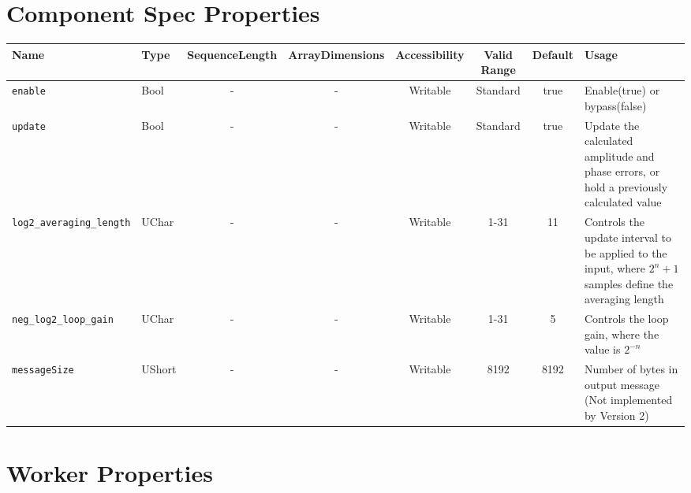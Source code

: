 \documentclass{article}
\begin{document}
\begin{landscape}
\section*{Component Spec Properties}
	\begin{scriptsize}
		\begin{tabular}{|p{3cm}|p{1.5cm}|c|c|c|c|c|p{7cm}|}
			\hline
			\rowcolor{blue}
			Name                         & Type   & SequenceLength & ArrayDimensions & Accessibility      & Valid Range & Default & Usage                                                                                                      \\
			\hline
			\verb+enable+                & Bool   & -              & -               & Writable & Standard    & true    & Enable(true) or bypass(false) \\
			\hline
			\verb+update+                & Bool   & -              & -               & Writable & Standard    & true    & Update the calculated amplitude and phase errors, or hold a previously calculated value                    \\
			\hline
			\verb+log2_averaging_length+ & UChar  & -              & -               & Writable & 1-31        & 11      & Controls the update interval to be applied to the input, where $2^n+1$ samples define the averaging length \\
			\hline
			\verb+neg_log2_loop_gain+    & UChar  & -              & -               & Writable & 1-31        & 5       & Controls the loop gain, where the value is $2^{-n}$                                                        \\
			\hline
			\verb+messageSize+           & UShort & -              & -               & Writable & 8192        & 8192    & Number of bytes in output message (Not implemented by Version 2)\\
			\hline
		\end{tabular}
	\end{scriptsize}

\section*{Worker Properties}

\end{landscape}
\end{document}
